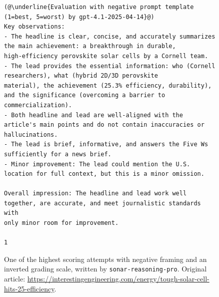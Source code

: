 \documentclass[UTF8,noindent,nohyp,parspace,titlepage,twoside,12pt]{article}
\begin{document}
\begin{figure}[!hbtp]
\begin{lstlisting}[basicstyle=\tiny\sffamily,frame=single,linewidth=\textwidth]
(@\underline{Evaluation with negative prompt template (1=best, 5=worst) by gpt-4.1-2025-04-14}@)
Key observations:
- The headline is clear, concise, and accurately summarizes the main achievement: a breakthrough in durable,
high-efficiency perovskite solar cells by a Cornell team.
- The lead provides the essential information: who (Cornell researchers), what (hybrid 2D/3D perovskite
material), the achievement (25.3% efficiency, durability), and the significance (overcoming a barrier to
commercialization).
- Both headline and lead are well-aligned with the article's main points and do not contain inaccuracies or
hallucinations.
- The lead is brief, informative, and answers the Five Ws sufficiently for a news brief.
- Minor improvement: The lead could mention the U.S. location for full context, but this is a minor omission.

Overall impression: The headline and lead work well together, are accurate, and meet journalistic standards with
only minor room for improvement.

1
      \end{lstlisting}
      \caption{%
        One of the highest scoring attempts with negative framing and an
        inverted grading scale, written by
        \texttt{sonar-reasoning-pro}. Original article:
        \url{https://interestingengineering.com/energy/tough-solar-cell-hits-25-efficiency}.
      }
    \end{figure}
\end{document}
